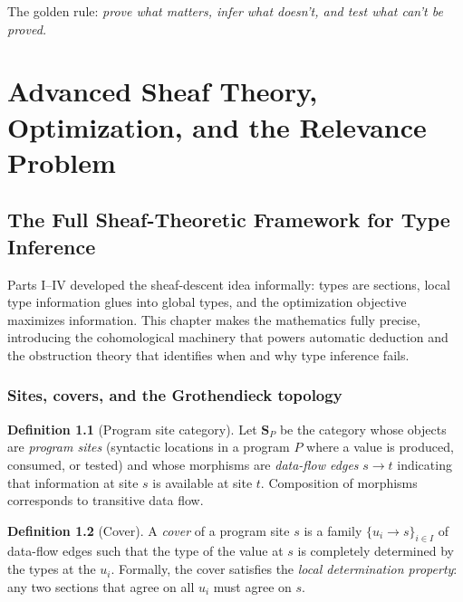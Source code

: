 \documentclass[11pt]{report}
\theoremstyle{definition}
\newtheorem{definition}{Definition}[section]
\theoremstyle{plain}
\begin{document}
The golden rule: \emph{prove what matters, infer what doesn't, and test
what can't be proved.}


\part{Advanced Sheaf Theory, Optimization, and the Relevance Problem}

\chapter{The Full Sheaf-Theoretic Framework for Type Inference}

Parts I--IV developed the sheaf-descent idea informally: types are sections,
local type information glues into global types, and the optimization objective
maximizes information. This chapter makes the mathematics fully precise,
introducing the cohomological machinery that powers automatic deduction and
the obstruction theory that identifies when and why type inference fails.

\section{Sites, covers, and the Grothendieck topology}

\begin{definition}[Program site category]
Let $\mathbf{S}_P$ be the category whose objects are \emph{program sites}
(syntactic locations in a program $P$ where a value is produced, consumed, or
tested) and whose morphisms are \emph{data-flow edges} $s \to t$ indicating
that information at site $s$ is available at site $t$. Composition of
morphisms corresponds to transitive data flow.
\end{definition}

\begin{definition}[Cover]
A \emph{cover} of a program site $s$ is a family $\{u_i \to s\}_{i \in I}$
of data-flow edges such that the type of the value at $s$ is completely
determined by the types at the $u_i$. Formally, the cover satisfies the
\emph{local determination property}: any two sections that agree on all
$u_i$ must agree on $s$.
\end{definition}
\end{document}
